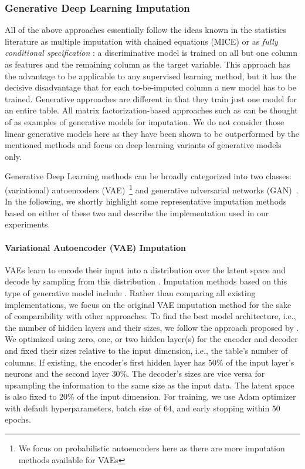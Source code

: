 \subsubsection{Generative Deep Learning Imputation}
\label{sec:generative_imputation}
%
All of the above approaches essentially follow the ideas known in the statistics literature as multiple imputation with chained equations (MICE) \citep{Little} or as {\em fully conditional specification} \citep{vanBuuren2018}: a discriminative model is trained on all but one column as features and the remaining column as the target variable. This approach has the advantage to be applicable to any supervised learning method, but it has the decisive disadvantage that for each to-be-imputed column a new model has to be trained. Generative approaches are different in that they train just one model for an entire table. All matrix factorization-based approaches such as \cite{Troyanskaya2001,Koren2009,Mazumder2010} can be thought of as examples of generative models for imputation. We do not consider those linear generative models here as they have been shown to be outperformed by the mentioned methods and focus on deep learning variants of generative models only.

Generative Deep Learning methods can be broadly categorized into two classes: (variational) autoencoders (VAE)~\citep{VAE}\footnote{We focus on probabilistic autoencoders here as there are more imputation methods available for VAEs} and generative adversarial networks (GAN)~\citep{GAN}. In the following, we shortly highlight some representative imputation methods based on either of these two and describe the implementation used in our experiments.

\paragraph{Variational Autoencoder (VAE) Imputation}
%
VAEs learn to encode their input into a distribution over the latent space and decode by sampling from this distribution \citep{VAE}. Imputation methods based on this type of generative model include \cite{HIVAE, VAE_for_genomic_data, VAEM}. Rather than comparing all existing implementations, we focus on the original VAE imputation method for the sake of comparability with other approaches. To find the best model architecture, i.e., the number of hidden layers and their sizes, we follow the approach proposed by \cite{CaminoVAE}. We optimized using zero, one, or two hidden layer(s) for the encoder and decoder and fixed their sizes relative to the input dimension, i.e., the table's number of columns. If existing, the encoder's first hidden layer has $50\%$ of the input layer's neurons and the second layer $30\%$. The decoder's sizes are vice versa for upsampling the information to the same size as the input data. The latent space is also fixed to $20\%$ of the input dimension.
For training, we use Adam optimizer with default hyperparameters, batch size of $64$, and early stopping within $50$ epochs.



